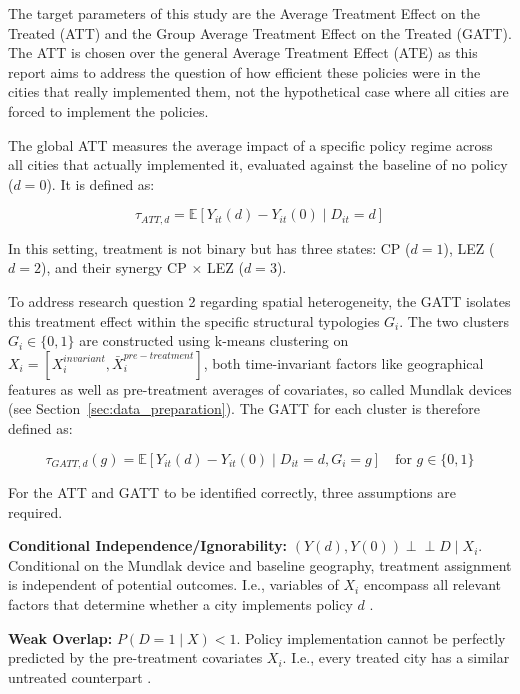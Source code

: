 \documentclass[12pt, a4paper]{article}
\begin{document}
The target parameters of this study are the Average Treatment Effect on the Treated (ATT) and the Group Average Treatment Effect on the Treated (GATT). The ATT is chosen over the general Average Treatment Effect (ATE) as this report aims to address the question of how efficient these policies were in the cities that really implemented them, not the hypothetical case where all cities are forced to implement the policies.

The global ATT measures the average impact of a specific policy regime across all cities that actually implemented it, evaluated against the baseline of no policy ($d=0$). It is defined as:

\begin{equation}
    \tau_{ATT, d} = \mathbb{E}[Y_{it}(d) - Y_{it}(0) \mid D_{it} = d]
\end{equation}

In this setting, treatment is not binary but has three states: CP ($d=1$), LEZ ($d=2$), and their synergy CP $\times$ LEZ ($d=3$).  

To address research question 2 regarding spatial heterogeneity, the GATT isolates this treatment effect within the specific structural typologies $G_i$. The two clusters $G_i \in \{0, 1\}$ are constructed using k-means clustering on $X_i = [X_{i}^{invariant}, \bar{X}_{i}^{pre-treatment}]$, both time-invariant factors like geographical features as well as pre-treatment averages of covariates, so called Mundlak devices (see Section~\ref{sec:data_preparation}). The GATT for each cluster is therefore defined as:

\begin{equation}
    \tau_{GATT, d}(g) = \mathbb{E}[Y_{it}(d) - Y_{it}(0) \mid D_{it} = d, G_i = g] \quad \text{for } g \in \{0, 1\}
\end{equation}

For the ATT and GATT to be identified correctly, three assumptions are required.

\begin{assumption}\label{as:cond_independence}
\textbf{Conditional Independence/Ignorability: } $(Y(d), Y(0)) \perp\!\!\!\perp D \mid X_i$. Conditional on the Mundlak device and baseline geography, treatment assignment is independent of potential outcomes. I.e., variables of $X_i$ encompass all relevant factors that determine whether a city implements policy $d$ \citep[Ch. 5]{CausalMLBookAppliedCausal}.
\end{assumption}

\begin{assumption}\label{as:overlap}
\textbf{Weak Overlap: } $P(D=1 \mid X) < 1$. Policy implementation cannot be perfectly predicted by the pre-treatment covariates $X_i$. I.e., every treated city has a similar untreated counterpart \citep[Ch. 5]{CausalMLBookAppliedCausal}.
\end{assumption}
\end{document}
